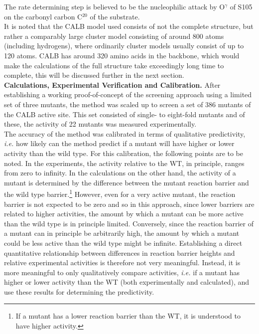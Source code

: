 The rate determining step is believed to be the nucleophilic attack by O$^\gamma$ of S105 on the carbonyl carbon C$^{20}$ of the substrate.\\
It is noted that the CALB model used consists of not the complete structure, but rather a comparably large cluster model consisting of around 800 atoms (including hydrogens), where ordinarily cluster models usually consist of up to 120 atoms.
CALB has around 320 amino acids in the backbone, which would make the calculations of the full structure take exceedingly long time to complete, this will be discussed further in the next section.\\
\textbf{Calculations, Experimental Verification and Calibration.}
After establishing a working proof-of-concept of the screening approach using a limited set of three mutants\cite{10.1371/journal.pone.0049849}, the method was scaled up to screen a set of 386 mutants of the CALB active site\cite{hediger2013silico}.
This set consisted of single- to eight-fold mutants and of these, the activity of 22 mutants was measured experimentally.\\
The accuracy of the method was calibrated in terms of qualitative predictivity, \textit{i.e.} how likely can the method predict if a mutant will have higher or lower activity than the wild type.
For this calibration, the following points are to be noted.
In the experiments, the activity relative to the WT, in principle, ranges from zero to infinity.
In the calculations on the other hand, the activity of a mutant is determined by the difference between the mutant reaction barrier and the wild type barrier.\footnote{If a mutant has a lower reaction barrier than the WT, it is understood to have higher activity.}
However, even for a very active mutant, the reaction barrier is not expected to be zero and so in this approach, since lower barriers are related to higher activities, the amount by which a mutant can be more active than the wild type is in principle limited.
Conversely, since the reaction barrier of a mutant can in principle be arbitrarily high, the amount by which a mutant could be less active than the wild type might be infinite.
Establishing a direct quantitative relationship between differences in reaction barrier heights and relative experimental activities is therefore not very meaningful.
Instead, it is more meaningful to only qualitatively compare activities, \textit{i.e.} if a mutant has higher or lower activity than the WT (both experimentally and calculated), and use these results for determining the predictivity.\\
